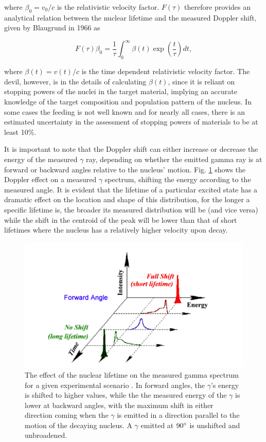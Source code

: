 \noindent where $\beta_{0} = v_{0}/c$ is the relativistic velocity factor. $F(\tau)$ therefore provides an analytical relation between the nuclear lifetime and the measured Doppler shift, given by Blaugrund in 1966 \cite{Blaugrund1966} as

\begin{equation}
F(\tau) \beta_{0} = \dfrac{1}{\tau} \int_{0}^{\infty} \beta(t) \exp \left( \dfrac{t}{\tau} \right) dt,
\end{equation} 

\noindent where $\beta(t) = v(t)/c$ is the time dependent relativistic velocity factor. The devil, however, is in the details of calculating $\beta(t)$, since it is reliant on stopping powers of the nuclei in the target material, implying an accurate knowledge of the target composition and population pattern of the nucleus. In some cases the feeding is not well known and for nearly all cases, there is an estimated uncertainty in the assessment of stopping powers of materials to be at least 10\%.

It is important to note that the Doppler shift can either increase or decrease the energy of the measured $\gamma$ ray, depending on whether the emitted gamma ray is at forward or backward angles relative to the nucleus' motion. Fig. \ref{fig: dopplerShift} shows the Doppler effect on a measured $\gamma$ spectrum, shifting the energy according to the measured angle. It is evident that the lifetime of a particular excited state has a dramatic effect on the location and shape of this distribution, for the longer a specific lifetime is, the broader its measured distribution will be (and vice versa) while the shift in the centroid of the peak will be lower than that of short lifetimes where the nucleus has a relatively higher velocity upon decay. 

\begin{figure}
\includegraphics[width=\linewidth]{figures/dopplerEffects.png}
\caption{The effect of the nuclear lifetime on the measured gamma spectrum for a given experimental scenario \cite{Schimpf2011}. In forward angles, the $\gamma$'s energy is shifted to higher values, while the the measured energy of the $\gamma$ is lower at backward angles, with the maximum shift in either direction coming when the $\gamma$ is emitted in a direction parallel to the motion of the decaying nucleus. A $\gamma$ emitted at $90\degree$ is unshifted and unbroadened. }
\label{fig: dopplerShift}
\end{figure}

